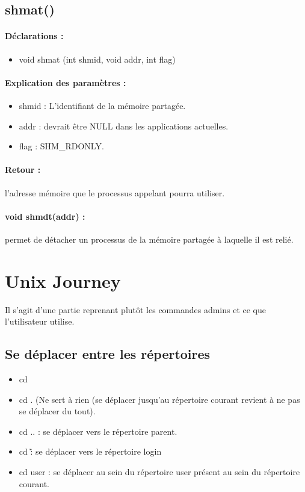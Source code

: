 \documentclass{article}[12pt]
\begin{document}
\subsection{shmat()}
\paragraph{Déclarations : }
\begin{itemize}
	\item void \*shmat (int shmid, void \*addr, int flag)
\end{itemize}
\paragraph{Explication des paramètres : }
\begin{itemize}
\item shmid : L'identifiant de la mémoire partagée. 
\item addr : devrait être NULL dans les applications actuelles.
\item flag : SHM\_RDONLY.  
\end{itemize}
\paragraph{Retour : } l'adresse mémoire que le processus appelant pourra utiliser.
\paragraph{void shmdt(addr) : } permet de détacher un processus de la mémoire partagée à laquelle il est relié. 
\section{Unix Journey}
Il s'agit d'une partie reprenant plutôt les commandes admins et ce que l'utilisateur utilise.
\subsection{Se déplacer entre les répertoires}
\begin{itemize}
\item cd 
\item cd . (Ne sert à rien (se déplacer jusqu'au répertoire courant revient à ne pas se déplacer du tout). 
\item cd .. : se déplacer vers le répertoire parent. 
\item cd \~ : se déplacer vers le répertoire login
\item cd user : se déplacer au sein du répertoire user présent au sein du répertoire courant.
\end{itemize}
\end{document}
